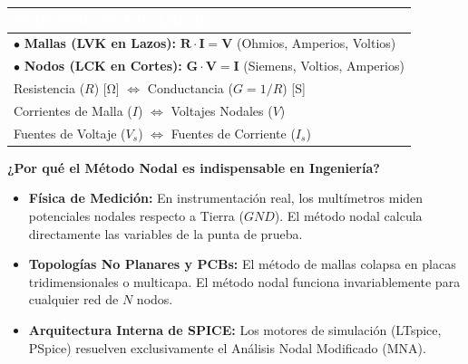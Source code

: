 \documentclass[11pt, a4paper]{article}
\begin{document}
\begin{center}
    \renewcommand{\arraystretch}{1.5}
    \begin{tabularx}{0.85\textwidth}{|X|}
        \hline
        \cellcolor{ucbblue}\textcolor{white}{\textbf{PRINCIPIO DE DUALIDAD}} \\
        \hline
        $\bullet$ \textbf{Mallas (LVK en Lazos):} $\mathbf{R} \cdot \mathbf{I} = \mathbf{V}$ \quad (Ohmios, Amperios, Voltios) \\
        $\bullet$ \textbf{Nodos (LCK en Cortes):} $\mathbf{G} \cdot \mathbf{V} = \mathbf{I}$ \quad (Siemens, Voltios, Amperios) \\[0.2cm]
        \hspace{1cm} Resistencia ($R$) [\unit{\ohm}] \hfill $\iff$ \hfill Conductancia ($G = 1/R$) [\unit{\siemens}] \hspace{1cm} \\
        \hspace{1cm} Corrientes de Malla ($I$) \hfill $\iff$ \hfill Voltajes Nodales ($V$) \hspace{1cm} \\
        \hspace{1cm} Fuentes de Voltaje ($V_s$) \hfill $\iff$ \hfill Fuentes de Corriente ($I_s$) \hspace{1cm} \\
        \hline
    \end{tabularx}
\end{center}

\textbf{¿Por qué el Método Nodal es indispensable en Ingeniería?}
\begin{itemize}[label=\textcolor{ucbblue}{\textbullet}, itemsep=2pt]
    \item \textbf{Física de Medición:} En instrumentación real, los multímetros miden potenciales nodales respecto a Tierra ($GND$). El método nodal calcula directamente las variables de la punta de prueba.
    \item \textbf{Topologías No Planares y PCBs:} El método de mallas colapsa en placas tridimensionales o multicapa. El método nodal funciona invariablemente para cualquier red de $N$ nodos.
    \item \textbf{Arquitectura Interna de SPICE:} Los motores de simulación (LTspice, PSpice) resuelven exclusivamente el Análisis Nodal Modificado (MNA).
\end{itemize}
\end{document}
